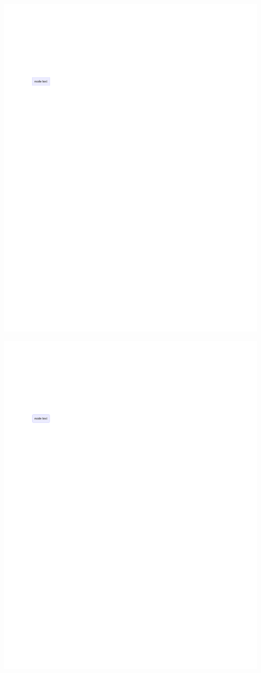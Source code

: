 \documentclass[
  letterpaper,
]{scrbook}
\begin{document}
\includegraphics{./summary_files/figure-pdf/unnamed-chunk-4-1.pdf}

\includegraphics{./summary_files/figure-pdf/unnamed-chunk-4-2.pdf}
\end{document}
